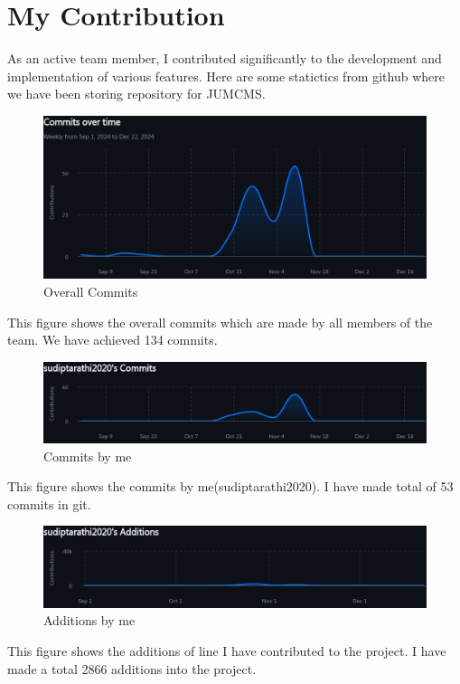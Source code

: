 \documentclass[a4paper,12pt]{article}
\begin{document}
\section{My Contribution}
As an active team member, I contributed significantly to the development and implementation of various
features. Here are some statictics from github where we have been storing repository for JUMCMS.
\begin{figure}[H]
    \centering
    \includegraphics[width=1\textwidth]{images/Commits over time.png}
    \caption{Overall Commits}
    \label{fig:overallcommits}
\end{figure}
This figure shows the overall commits which are made by all members of the team. We have achieved 134 commits.
\begin{figure}[H]
    \centering
    \includegraphics[width=1\textwidth]{images/sudiptarathi2020's Commits.png}
    \caption{Commits by me}
    \label{fig:mycommits}
\end{figure}
This figure shows the commits by me(sudiptarathi2020). I have made total of 53 commits in git. 
\begin{figure}[H]
    \centering
    \includegraphics[width=1\textwidth]{images/sudiptarathi2020's Additions.png}
    \caption{Additions by me}
    \label{fig:myadditions}
\end{figure}
This figure shows the additions of line I have contributed to the project. I have made a total 2866 additions
into the project.
\end{document}
